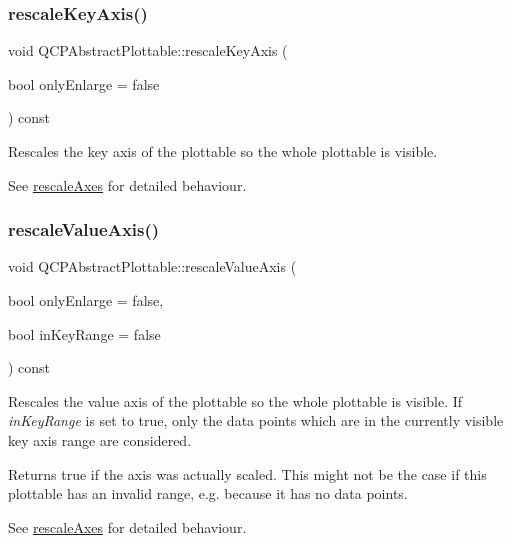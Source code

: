 \subsubsection{\texorpdfstring{rescale\+Key\+Axis()}{rescaleKeyAxis()}}
{\footnotesize\ttfamily void Q\+C\+P\+Abstract\+Plottable\+::rescale\+Key\+Axis (\begin{DoxyParamCaption}\item[{bool}]{only\+Enlarge = {\ttfamily false} }\end{DoxyParamCaption}) const}

Rescales the key axis of the plottable so the whole plottable is visible.

See \mbox{\hyperlink{class_q_c_p_abstract_plottable_a1491c4a606bccd2d09e65e11b79eb882}{rescale\+Axes}} for detailed behaviour. \mbox{\label{class_q_c_p_abstract_plottable_a714eaf36b12434cd71846215504db82e}} 
\subsubsection{\texorpdfstring{rescale\+Value\+Axis()}{rescaleValueAxis()}}
{\footnotesize\ttfamily void Q\+C\+P\+Abstract\+Plottable\+::rescale\+Value\+Axis (\begin{DoxyParamCaption}\item[{bool}]{only\+Enlarge = {\ttfamily false},  }\item[{bool}]{in\+Key\+Range = {\ttfamily false} }\end{DoxyParamCaption}) const}

Rescales the value axis of the plottable so the whole plottable is visible. If {\itshape in\+Key\+Range} is set to true, only the data points which are in the currently visible key axis range are considered.

Returns true if the axis was actually scaled. This might not be the case if this plottable has an invalid range, e.\+g. because it has no data points.

See \mbox{\hyperlink{class_q_c_p_abstract_plottable_a1491c4a606bccd2d09e65e11b79eb882}{rescale\+Axes}} for detailed behaviour. \mbox{\label{class_q_c_p_abstract_plottable_a663b1a44123c8340ac041a29d1e2c973}} 
